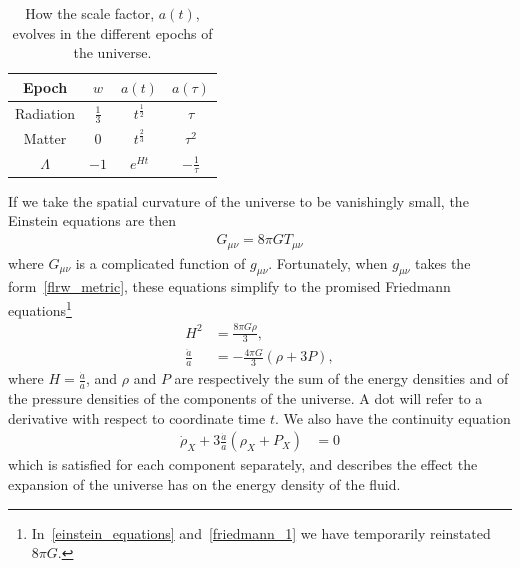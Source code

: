     \begin{table}[h!]
    \begin{center}
        \begin{tabular}{ c c c c }
            Epoch & $w$ & $a(t)$ & $a(\tau)$ \\ 
            \toprule
            Radiation & $\frac{1}{3}$ & $t^{\frac{1}{2}}$ & $\tau$ \\
            Matter & $0$ & $t^{\frac{2}{3}}$ & $\tau^2$ \\
            $\Lambda$ & $-1$ & $e^{Ht}$ & $-\frac{1}{\tau}$
        \end{tabular}\caption{
            How the scale factor, $a(t)$, evolves in the
            different epochs of the universe.
        }\label{lcdm_dep_table}
    \end{center}
    \end{table}


    If we take the spatial curvature of the universe to be vanishingly small,
    the Einstein equations are then
    \begin{align}\label{einstein_equations}
        G_{\mu\nu} = 8\pi G T_{\mu\nu}
    \end{align}
    where $G_{\mu\nu}$ is a complicated function of $g_{\mu\nu}$.
    Fortunately, when $g_{\mu\nu}$ takes the form~\eqref{flrw_metric},
    these equations simplify to the promised Friedmann equations\footnote{
        In~\eqref{einstein_equations} and~\eqref{friedmann_1} we have temporarily reinstated $8\pi G$.}
    \begin{align}\label{friedmann_1}
        H^2 &= \frac{8\pi G \rho}{3},\\
        \frac{\ddot{a}}{a} &= -\frac{4\pi G}{3}\left(\rho+3P\right),
    \end{align}
    where $H=\frac{\dot{a}}{a}$, and $\rho$ and $P$ are respectively the sum of the
    energy densities and of the pressure densities of the
    components of the universe.
    A dot will refer to a derivative with respect to coordinate time $t$.
    We also have the continuity equation
    \begin{align}\label{continuity_equation}
        \dot{\rho}_X + 3\frac{\dot{a}}{a}\left(\rho_X+P_X\right) &= 0
    \end{align}
    which is satisfied for each component separately, and describes
    the effect the expansion of the universe has on the energy density of the fluid.

